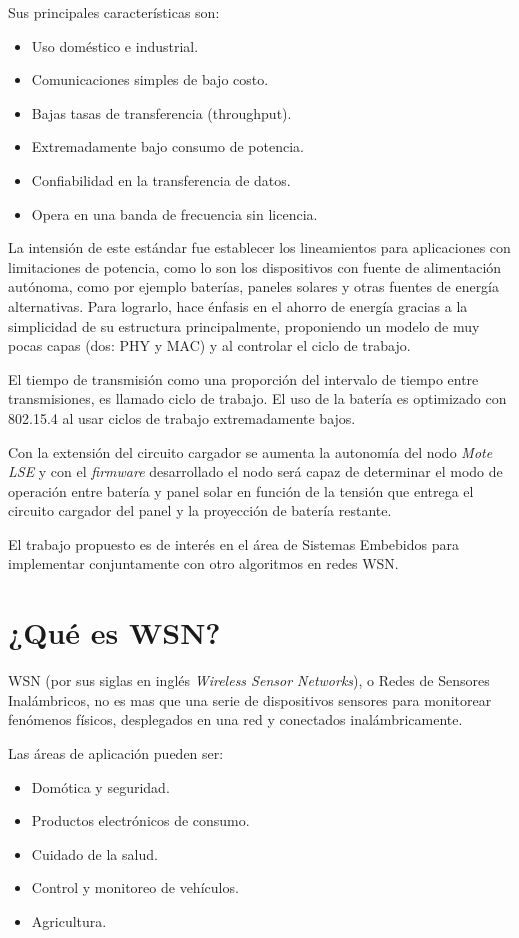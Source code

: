 \noindent Sus principales características son:
		\begin{itemize}
			\item Uso doméstico e industrial.
			\item Comunicaciones simples de bajo costo. 
			\item Bajas tasas de transferencia (throughput).
			\item Extremadamente bajo consumo de potencia.
			\item Confiabilidad en la transferencia de datos.
			\item Opera en una banda de frecuencia sin licencia.
		\end{itemize}

La intensión de este estándar fue establecer los lineamientos para aplicaciones con limitaciones de potencia, como lo son los dispositivos con fuente de alimentación autónoma, como por ejemplo baterías, paneles solares y otras fuentes de energía alternativas. Para lograrlo, hace énfasis en el ahorro de energía gracias a la simplicidad de su estructura principalmente, proponiendo un modelo de muy pocas capas (dos: PHY y MAC) y al controlar el ciclo de trabajo.

El tiempo de transmisión como una proporción del intervalo de tiempo entre transmisiones, es llamado ciclo de trabajo. El uso de la batería es optimizado con 802.15.4 al usar ciclos de trabajo extremadamente bajos. 
		
Con la extensión del circuito cargador se aumenta la autonomía del nodo \textit{Mote LSE} y con el \textit{firmware} desarrollado el nodo será capaz de determinar el modo de operación entre batería y panel solar en función de la tensión que entrega el circuito cargador del panel y la proyección de batería restante.

El trabajo propuesto es de interés en el área de Sistemas Embebidos para implementar conjuntamente con otro algoritmos en redes WSN.

\section{¿Qué es WSN?}
\label{sec:wsn}

WSN (por sus siglas en inglés \textit{Wireless Sensor Networks}), o Redes de Sensores Inalámbricos, no es mas que una serie de dispositivos sensores para monitorear fenómenos físicos, desplegados en una red y conectados inalámbricamente.

\noindent Las áreas de aplicación pueden ser:
		\begin{itemize}
			\item Domótica y seguridad.
			\item Productos electrónicos de consumo.
			\item Cuidado de la salud.
			\item Control y monitoreo de vehículos.
			\item Agricultura.
		\end{itemize}


